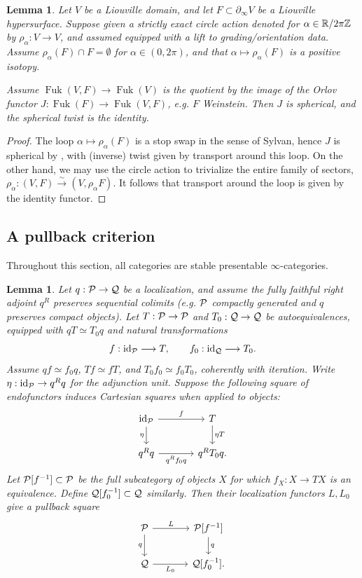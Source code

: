\documentclass[12pt, letter]{amsart}
\DeclareMathOperator{\Fuk}{Fuk}
\newtheorem{lemma}[dummy]{Lemma}
\theoremstyle{definition}
\begin{document}
\begin{lemma}
\label{lem:circle-twist}
Let $V$ be a Liouville domain, and let  $F \subset \partial_{\infty} V$ be a Liouville hypersurface.   Suppose given a strictly exact circle action denoted for 
$\alpha \in \mathbb{R}/2\pi \mathbb{Z}$ by 
$\rho_\alpha: V \to V$, and assumed equipped with a lift to grading/orientation data.  Assume  $\rho_\alpha(F) \cap F = \emptyset$ for $\alpha \in (0, 2\pi)$, and that 
$\alpha\mapsto\rho_\alpha(F)$ is a positive isotopy.

Assume $\Fuk(V, F) \to \Fuk(V)$ is the quotient by the image of the  Orlov functor $J:\Fuk(F)\to\Fuk(V,F)$, e.g. $F$ Weinstein.  
Then $J$ is spherical, and the spherical twist is the identity. 
\end{lemma}
\begin{proof}
The loop $\alpha\mapsto\rho_\alpha(F)$ is a stop swap in the sense of Sylvan, hence $J$ is spherical by \cite[Thm. 1.3]{Sy}, with (inverse) twist given by transport around this loop.
On the other hand, we may use the circle action to trivialize the entire family of sectors, $
 \rho_\alpha:(V,F)\xrightarrow{\sim}(V, \rho_\alpha F)$.
It follows that transport around the loop is given by the identity functor. 
\end{proof}








\subsection{A pullback criterion}


Throughout this section, all categories are stable presentable $\infty$-categories. 


\begin{lemma}\label{lem:magic-pullback}
Let $q:\mathcal{P}\to\mathcal{Q}$ be a localization, and assume the fully faithful right adjoint $q^R$ preserves sequential colimits (e.g. $\mathcal{P}$ compactly generated and $q$ preserves compact objects).
Let $T: \mathcal{P} \to \mathcal{P}$ and $T_0: \mathcal{Q} \to \mathcal{Q}$ be autoequivalences, equipped with $qT\simeq T_0q$ and natural transformations
\[
 f:\mathrm{id}_{\mathcal{P}}\longrightarrow T,\qquad
 f_0:\mathrm{id}_{\mathcal{Q}}\longrightarrow T_0.
\]
Assume $qf\simeq f_0q$, $Tf\simeq fT$, and $T_0f_0\simeq f_0T_0$, coherently with iteration.
Write $\eta:\mathrm{id}_{\mathcal{P}}\to q^Rq$ for the adjunction unit.
Suppose the following square of endofunctors induces Cartesian squares when applied to objects: 
\[
\begin{tikzcd}[column sep=large]
 \id_{\cP}\ar[r,"f"]\ar[d,"\eta"']
 &T\ar[d,"\eta T"]\\
 q^Rq\ar[r,"q^Rf_0q"']&q^RT_0q.
\end{tikzcd}
\]
Let $\mathcal{P}[f^{-1}]\subset\mathcal{P}$ be the full subcategory of objects $X$ for which $f_X:X\to TX$ is an equivalence.
Define $\mathcal{Q}[f_0^{-1}]\subset\mathcal{Q}$ similarly.
Then their localization functors $L,L_0$ give a pullback square
\[
\begin{tikzcd}[column sep=large]
 \cP\ar[r,"L"]\ar[d,"q"']
 &\cP[f^{-1}]\ar[d,"q"]\\
 \cQ\ar[r,"L_0"']&\cQ[f_0^{-1}].
\end{tikzcd}
\]
\end{lemma}
\end{document}
